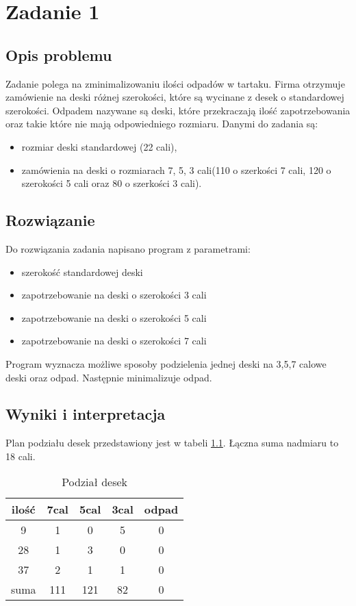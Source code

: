 \chapter{Zadanie 1}
\thispagestyle{chapterBeginStyle}
\label{rozdzial1}

\section{Opis problemu}
Zadanie polega na zminimalizowaniu ilości odpadów w tartaku. Firma otrzymuje zamówienie na deski
różnej szerokości, które są wycinane z desek o standardowej szerokości. Odpadem nazywane są deski,
które przekraczają ilość zapotrzebowania oraz takie które nie mają odpowiedniego rozmiaru. 
Danymi do zadania są: 
\begin{itemize}
    \item rozmiar deski standardowej (22 cali),
    \item zamówienia na deski o rozmiarach 7, 5, 3 cali(110 o szerkości 7 cali, 120 o szerokości 5 cali oraz 80 o szerkości 3 cali).
\end{itemize}

 \section{Rozwiązanie}
 Do rozwiązania zadania napisano program z parametrami:
 \begin{itemize}
    \item szerokość standardowej deski
    \item zapotrzebowanie na deski o szerokości 3 cali
    \item zapotrzebowanie na deski o szerokości 5 cali
    \item zapotrzebowanie na deski o szerokości 7 cali
\end{itemize}
Program wyznacza możliwe sposoby podzielenia jednej deski na 3,5,7 calowe deski oraz odpad. Następnie
minimalizuje odpad. 

\section{Wyniki i interpretacja}
Plan podziału desek przedstawiony jest w tabeli \ref{tabela_zad1}. Łączna suma nadmiaru to 18 cali. 

\begin{table}[ht]
    \begin{center}
        \begin{tabular}{|c | c| c| c| c|} 
            \hline
            \rowcolor{lgray}
            ilość & 7cal & 5cal & 3cal & odpad \\
            \hline
            9 & 1 & 0 & 5 & 0\\
            \hline
            28 & 1 & 3 & 0 & 0\\
            \hline
            37 & 2 & 1 & 1 & 0\\
            \hline
            \rowcolor{lgray}
            suma & 111 & 121 & 82 & 0\\
            \hline
        \end{tabular}
        \caption{Podział desek}
        \label{tabela_zad1}
    \end{center}
\end{table}

